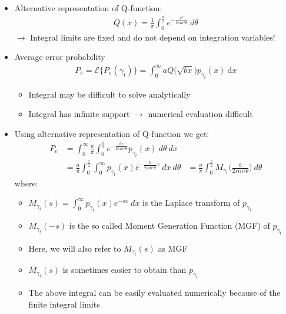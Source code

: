 \documentclass[a4paper, 10pt]{article}
\begin{document}
\begin{itemize}
	\item Alternative representation of Q\;-\;function:
			\begin{align*} 
			Q(x) = \frac{1}{\pi}\int_{0}^{\frac{\pi}{2}} e^{-\frac{x^2}{2sin^2\theta}}~d\theta
			\end{align*}
			$\rightarrow$ Integral limits are fixed and do not depend on integration variables!
	\item Average error probability
		\begin{align*} 
		P_e = \mathcal{E}\bigl \{P_e(\gamma_t)\bigr \} = \int_{0}^{\infty}aQ\bigr (\sqrt{bx}\bigl )p_{\gamma_t}(x)~\mathrm{d}x
		\end{align*}
		\begin{itemize}
			\item Integral may be difficult to solve analytically
			\item Integral has infinite support $\rightarrow$ numerical evaluation difficult
		\end{itemize}
	\item Using alternative representation of Q-function we get:
		\begin{align*}
			P_e &= \int_{0}^{\infty}\frac{a}{\pi}\int_{0}^{\frac{\pi}{2}}e^{-\frac{bx}{2sin^2\theta}}p_{\gamma_t}(x)~d\theta ~dx\\
			&= \frac{a}{\pi}\int_{0}^{\frac{\pi}{2}}\int_{0}^{\infty}p_{\gamma_t}(x)e^{-\frac{b}{2sin^2\theta}x}~dx~d\theta &= \frac{a}{\pi}\int_{0}^{\frac{\pi}{2}}M_{\gamma_t}\bigl ( \frac{b}{2sin^2\theta} \bigr )~d\theta
		\end{align*}
where:
		\begin{itemize}
				\item $M_{\gamma_t}(s) = \int_{0}^{\infty}p_{\gamma_t}(x)e^{-sx}~dx$ is the Laplace transform of $p_{\gamma_t}$	
				\item $M_{\gamma_t}(-s)$ is the so called Moment Generation Function (MGF) of $p_{\gamma_t}$
				\item Here, we will also refer to $M_{\gamma_t}(s)$ as MGF
				\item $M_{\gamma_t}(s)$ is sometimes easier to obtain than $p_{\gamma_t}$
				\item The above integral can be easily evaluated numerically because of the finite integral limits
			\end{itemize}
\end{itemize}
\end{document}
